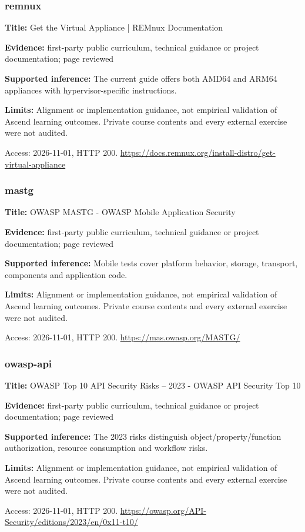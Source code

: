 \subsubsection{remnux}
\noindent\textbf{Title:} Get the Virtual Appliance | REMnux Documentation\par
\noindent\textbf{Evidence:} first-party public curriculum, technical guidance or project documentation; page reviewed\par
\noindent\textbf{Supported inference:} The current guide offers both AMD64 and ARM64 appliances with hypervisor-specific instructions.\par
\noindent\textbf{Limits:} Alignment or implementation guidance, not empirical validation of Ascend learning outcomes. Private course contents and every external exercise were not audited.\par
\noindent Access: 2026-11-01, HTTP 200. \url{https://docs.remnux.org/install-distro/get-virtual-appliance}
\subsubsection{mastg}
\noindent\textbf{Title:} OWASP MASTG - OWASP Mobile Application Security\par
\noindent\textbf{Evidence:} first-party public curriculum, technical guidance or project documentation; page reviewed\par
\noindent\textbf{Supported inference:} Mobile tests cover platform behavior, storage, transport, components and application code.\par
\noindent\textbf{Limits:} Alignment or implementation guidance, not empirical validation of Ascend learning outcomes. Private course contents and every external exercise were not audited.\par
\noindent Access: 2026-11-01, HTTP 200. \url{https://mas.owasp.org/MASTG/}
\subsubsection{owasp-api}
\noindent\textbf{Title:} OWASP Top 10 API Security Risks – 2023 - OWASP API Security Top 10\par
\noindent\textbf{Evidence:} first-party public curriculum, technical guidance or project documentation; page reviewed\par
\noindent\textbf{Supported inference:} The 2023 risks distinguish object/property/function authorization, resource consumption and workflow risks.\par
\noindent\textbf{Limits:} Alignment or implementation guidance, not empirical validation of Ascend learning outcomes. Private course contents and every external exercise were not audited.\par
\noindent Access: 2026-11-01, HTTP 200. \url{https://owasp.org/API-Security/editions/2023/en/0x11-t10/}
